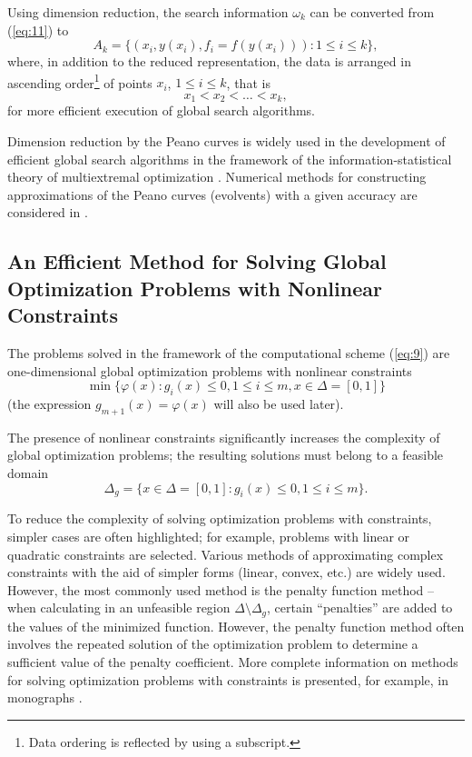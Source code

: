 \documentclass[smallextended]{svjour3}       %
\begin{document}
Using dimension reduction, the search information $\omega_k$ can be converted from (\ref{eq:11}) to 
\begin{equation}\label{eq:14}
A_k=\{(x_i, y(x_i), f_i=f(y(x_i))): 1 \leq i \leq k \},
\end{equation}
where, in addition to the reduced representation, the data is arranged in ascending order\footnote{Data ordering is reflected by using a subscript.} of points $x_i$, $1 \leq i \leq k$, that is
\begin{equation} \label{eq:15}
x_1 < x_2 < \dots < x_k,	
\end{equation}
for more efficient execution of global search algorithms.

Dimension reduction by the Peano curves is widely used in the development of efficient global search algorithms in the framework of the information-statistical theory of multiextremal optimization \cite{c17,c18,c23,c26,c27,Grishagin2016_2}. Numerical methods for constructing approximations of the Peano curves (evolvents) with a given accuracy are considered in \cite{c17,c18}.

\subsection{An Efficient Method for Solving Global Optimization Problems with Nonlinear Constraints}

The problems solved in the framework of the computational scheme (\ref{eq:9}) are one-dimensional global optimization problems with nonlinear constraints
\begin{equation}\label{eq:16}
\min{\{\varphi(x):g_i(x)\leq 0, 1 \leq i \leq m, x\in \Delta=[0,1]\}}
\end{equation}
(the expression $g_{m+1}(x) = \varphi(x)$ will also be used later).

The presence of nonlinear constraints significantly increases the complexity of global optimization problems; the resulting solutions must belong to a feasible domain
\begin{equation}\label{eq:17}
\Delta_g  = \{ x\in \Delta=[0,1]:g_i(x)\leq 0, 1 \leq i \leq m \}.
\end{equation}

To reduce the complexity of solving optimization problems with constraints, simpler cases are often highlighted; for example, problems with linear or quadratic constraints are selected. Various methods of approximating complex constraints with the aid of simpler forms (linear, convex, etc.) are widely used. However, the most commonly used method is the penalty function method -- when calculating in an unfeasible region $\Delta \setminus \Delta_g$, certain ``penalties'' are added to the values of the minimized function. However, the penalty function method often involves the repeated solution of the optimization problem to determine a sufficient value of the penalty coefficient. More complete information on methods for solving optimization problems with constraints is presented, for example, in monographs \cite{c28,c29}.
\end{document}

